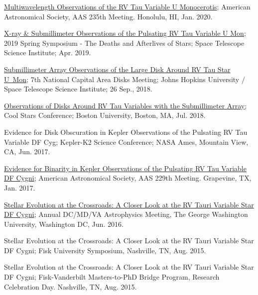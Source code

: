 \documentclass[12pt]{article}
\begin{document}
\begin{etaremune}
\item \href{https://ui.adsabs.harvard.edu/abs/2020AAS...23510607V/abstract}{Multiwavelength Observations of the RV Tau Variable U Monocerotis}; American Astronomical Society, AAS 235th Meeting.  Honolulu, HI, Jan.  2020.

\item \href{http://www.stsci.edu/~ofox/posters2019/}{X-ray \& Submillimeter Observations of the Pulsating RV Tau Variable U Mon}; 2019 Spring Symposium - The Deaths and Afterlives of Stars; Space Telescope Science Institute; Apr. 2019.

\item \href{https://sites.google.com/view/ncad7-at-jhu/program?authuser=0}{Submillimeter Array Observations of the Large Disk Around RV Tau Star U~Mon}; 7th National Capital Area Disks Meeting; Johns Hopkins University / Space Telescope Science Institute; 26 Sep., 2018.

\item \href{http://coolstars20.cfa.harvard.edu/abstracts.html#posters}{Observations of Disks Around RV Tau Variables with the Submillimeter Array}; Cool Stars Conference; Boston University, Boston, MA, Jul. 2018.

\item Evidence for Disk Obscuration in Kepler Observations of the Pulsating RV Tau Variable DF Cyg; Kepler-K2 Science Conference; NASA Ames, Mountain View, CA, Jun. 2017.

\item \href{http://adsabs.harvard.edu/abs/2017AAS...22915210V}{Evidence for Binarity in Kepler Observations of the Pulsating RV Tau Variable DF Cygni}; American  Astronomical  Society,  AAS  229th  Meeting. Grapevine, TX, Jan. 2017.

\item \href{https://physics.columbian.gwu.edu/sites/g/files/zaxdzs1976/f/downloads/Astro2016_Conf_program_final.pdf}{Stellar  Evolution at the Crossroads: A Closer Look at the RV Tauri Variable Star DF Cygni};  Annual DC/MD/VA Astrophysics Meeting, The George Washington University, Washington DC, Jun. 2016.

\item Stellar Evolution at the Crossroads: A Closer Look at the RV Tauri Variable Star DF Cygni; Fisk University Symposium, Nashville, TN, Aug. 2015. 

\item Stellar Evolution at the Crossroads: A Closer Look at the RV Tauri Variable Star DF Cygni; Fisk-Vanderbilt Masters-to-PhD Bridge Program, Research Celebration Day. Nashville, TN, Aug. 2015. 


\end{etaremune}
\end{document}
